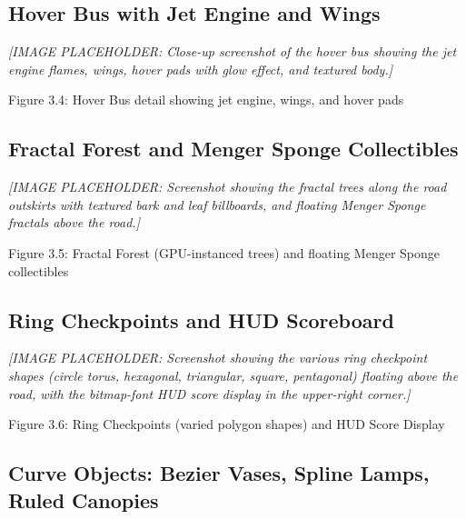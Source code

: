 \documentclass[12pt,a4paper]{article}
\begin{document}
\subsection{Hover Bus with Jet Engine and Wings}

\textit{[IMAGE PLACEHOLDER: Close-up screenshot of the hover bus showing the jet engine flames, wings, hover pads with glow effect, and textured body.]}

\begin{center}
    Figure 3.4: Hover Bus detail showing jet engine, wings, and hover pads
\end{center}

\subsection{Fractal Forest and Menger Sponge Collectibles}

\textit{[IMAGE PLACEHOLDER: Screenshot showing the fractal trees along the road outskirts with textured bark and leaf billboards, and floating Menger Sponge fractals above the road.]}

\begin{center}
    Figure 3.5: Fractal Forest (GPU-instanced trees) and floating Menger Sponge collectibles
\end{center}

\subsection{Ring Checkpoints and HUD Scoreboard}

\textit{[IMAGE PLACEHOLDER: Screenshot showing the various ring checkpoint shapes (circle torus, hexagonal, triangular, square, pentagonal) floating above the road, with the bitmap-font HUD score display in the upper-right corner.]}

\begin{center}
    Figure 3.6: Ring Checkpoints (varied polygon shapes) and HUD Score Display
\end{center}

\subsection{Curve Objects: Bezier Vases, Spline Lamps, Ruled Canopies}
\end{document}
